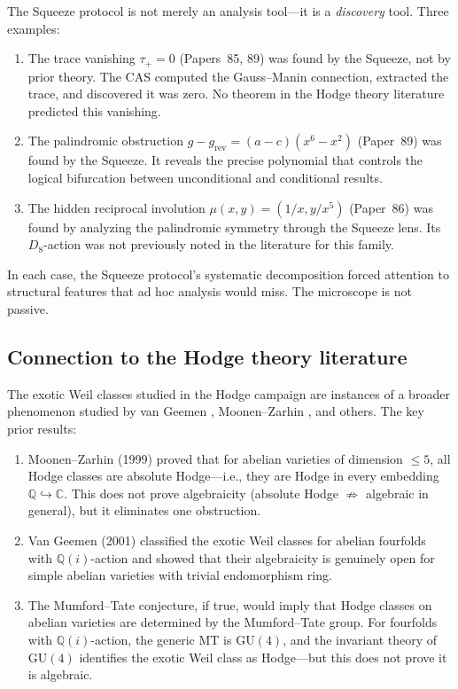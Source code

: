 \documentclass[11pt]{article}
\theoremstyle{plain}
\theoremstyle{definition}
\theoremstyle{remark}
\newcommand{\QQ}{\mathbb{Q}}
\newcommand{\CC}{\mathbb{C}}
\newcommand{\MT}{\mathrm{MT}}
\newcommand{\GU}{\mathrm{GU}}
\begin{document}
The Squeeze protocol is not merely an analysis tool---it is a
\emph{discovery} tool.  Three examples:

\begin{enumerate}[label=(\roman*)]
\item The trace vanishing $\tau_+ = 0$ (Papers~85, 89) was found
  by the Squeeze, not by prior theory.  The CAS computed the
  Gauss--Manin connection, extracted the trace, and discovered it
  was zero.  No theorem in the Hodge theory literature predicted
  this vanishing.

\item The palindromic obstruction $g - g_{\mathrm{rev}} = (a-c)(x^6 - x^2)$
  (Paper~89) was found by the Squeeze.  It reveals the precise
  polynomial that controls the logical bifurcation between
  unconditional and conditional results.

\item The hidden reciprocal involution $\mu(x,y) = (1/x, y/x^5)$
  (Paper~86) was found by analyzing the palindromic symmetry
  through the Squeeze lens.  Its $D_8$-action was not previously
  noted in the literature for this family.
\end{enumerate}

In each case, the Squeeze protocol's systematic decomposition
forced attention to structural features that ad hoc analysis
would miss.  The microscope is not passive.

\subsection{Connection to the Hodge theory literature}

The exotic Weil classes studied in the Hodge campaign are instances
of a broader phenomenon studied by van Geemen \cite{van-geemen},
Moonen--Zarhin \cite{moonen-zarhin}, and others.  The key prior results:

\begin{enumerate}[label=(\roman*)]
\item Moonen--Zarhin (1999) proved that for abelian varieties of
  dimension $\leq 5$, all Hodge classes are absolute Hodge---i.e.,
  they are Hodge in every embedding $\QQ \hookrightarrow \CC$.
  This does not prove algebraicity (absolute Hodge $\not\Rightarrow$
  algebraic in general), but it eliminates one obstruction.

\item Van Geemen (2001) classified the exotic Weil classes for
  abelian fourfolds with $\QQ(i)$-action and showed that their
  algebraicity is genuinely open for simple abelian varieties with
  trivial endomorphism ring.

\item The Mumford--Tate conjecture, if true, would imply that
  Hodge classes on abelian varieties are determined by the
  Mumford--Tate group.  For fourfolds with $\QQ(i)$-action, the
  generic $\MT$ is $\GU(4)$, and the invariant theory of $\GU(4)$
  identifies the exotic Weil class as Hodge---but this does not
  prove it is algebraic.
\end{enumerate}
\end{document}
